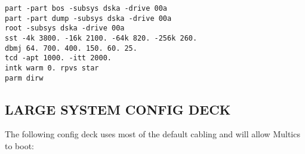 \begin{adjustwidth}{5ex}{1ex}
    \texttt{part -part bos -subsys dska -drive 00a} \\
    \texttt{part -part dump -subsys dska -drive 00a} \\
    \texttt{root -subsys dska -drive 00a} \\
    \texttt{sst  -4k 3800. -16k 2100. -64k 820. -256k 260.} \\
    \texttt{dbmj 64. 700. 400. 150. 60. 25.} \\
    \texttt{tcd -apt 1000. -itt 2000.} \\
    \texttt{intk warm 0. rpvs star} \\
    \texttt{parm dirw} \\
\end{adjustwidth}


\subsection[Large System Config Deck]{LARGE SYSTEM CONFIG DECK}

The following config deck uses most of the default cabling and will allow Multics to boot:

